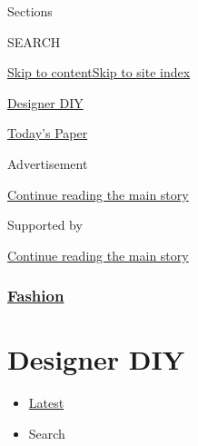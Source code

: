 Sections

SEARCH

\protect\hyperlink{site-content}{Skip to
content}\protect\hyperlink{site-index}{Skip to site index}

\href{https://www.nytimes3xbfgragh.onion/issue/fashion/2020/06/19/designer-diy}{Designer
DIY}

\href{https://myaccount.nytimes3xbfgragh.onion/auth/login?response_type=cookie\&client_id=vi}{}

\href{https://www.nytimes3xbfgragh.onion/section/todayspaper}{Today's
Paper}

Advertisement

\protect\hyperlink{after-top}{Continue reading the main story}

Supported by

\protect\hyperlink{after-sponsor}{Continue reading the main story}

\hypertarget{fashion}{%
\subsubsection{\texorpdfstring{\href{/section/fashion}{Fashion}}{Fashion}}\label{fashion}}

\hypertarget{designer-diy}{%
\section{Designer DIY}\label{designer-diy}}

\begin{itemize}
\tightlist
\item
  \protect\hyperlink{stream-panel}{Latest}
\item
  Search
\end{itemize}

